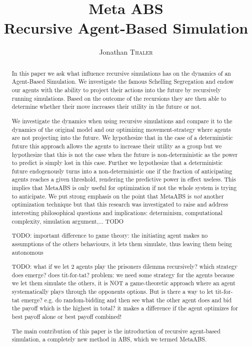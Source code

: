 \documentclass[a4paper, 10pt, conference]{IEEEtran}
\title{Meta ABS \\ Recursive Agent-Based Simulation} %
\author{Jonathan \textsc{Thaler}} %
\begin{document}
\maketitle %

\begin{abstract}
In this paper we ask what influence recursive simulations has on the dynamics of an Agent-Based Simulation. We investigate the famous Schelling Segregation and endow our agents with the ability to project their actions into the future by recursively running simulations. Based on the outcome of the recursions they are then able to determine whether their move increases their utility in the future or not.

We investigate the dynamics when using recursive simulations and compare it to the dynamics of the original model and our optimizing movement-strategy where agents are not projecting into the future. We hypothesize that in the case of a deterministic future this approach allows the agents to increase their utility as a group but we hypothesize that this is not the case when the future is non-deterministic as the power to predict is simply lost in this case.  Further we hypothesize that a deterministic future endogenously turns into a non-deterministic one if the fraction of anticipating agents reaches a given threshold, rendering the predictive power in effect useless. This implies that MetaABS is only useful for optimization if not the whole system is trying to anticipate. 
We put strong emphasis on the point that MetaABS is \textit{not} another optimization technique but that this research was investigated to raise and address interesting philosophical questions and implications: determinism, computational complexity, simulation argument,... TODO

TODO: important difference to game theory: the initiating agent makes no assumptions of the others behaviours, it lets them simulate, thus leaving them being autonomous

TODO:  what if we let 2 agents play the prisoners dilemma recursively? which strategy does emerge? does tit-for-tat? problem: we need some strategy for the agents because we let them simulate the others, it is NOT a game-theoretic approach where an agent systematically plays through the opponents options. But is there a way to let tit-for-tat emerge? e.g. do random-bidding and then see what the other agent does and bid the payoff which is the highest in total? it makes a difference if the agent optimizes for best payoff alone or best payoff combined!

The main contribution of this paper is the introduction of recursive agent-based simulation, a completely new method in ABS, which we termed MetaABS.
\end{abstract}













\end{document}
